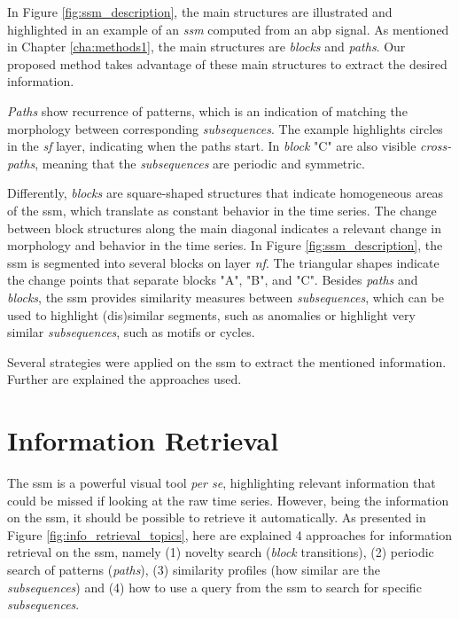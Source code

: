In Figure \ref{fig:ssm_description}, the main structures are illustrated and highlighted in an example of an \textit{\gls{ssm}} \cite{audiolabs1} computed from an \gls{abp} signal. As mentioned in Chapter \ref{cha:methods1}, the main structures are \textit{blocks} and \textit{paths}. Our proposed method takes advantage of these main structures to extract the desired information.
\par
\textit{Paths} show recurrence of patterns, which is an indication of matching the morphology between corresponding \textit{subsequences}. The example highlights circles in the \textit{sf} layer, indicating when the paths start. In \textit{block} "C" are also visible \textit{cross-paths}, meaning that the \textit{subsequences} are periodic and symmetric.
\par
Differently, \textit{blocks} are square-shaped structures that indicate homogeneous areas of the \gls{ssm}, which translate as constant behavior in the time series. The change between block structures along the main diagonal indicates a relevant change in morphology and behavior in the time series. In Figure \ref{fig:ssm_description}, the \gls{ssm} is segmented into several blocks on layer \textit{nf}. The triangular shapes indicate the change points that separate blocks "A", "B", and "C". Besides \textit{paths} and \textit{blocks}, the \gls{ssm} provides similarity measures between \textit{subsequences}, which can be used to highlight (dis)similar segments, such as anomalies or highlight very similar \textit{subsequences}, such as motifs or cycles.
\par
Several strategies were applied on the \gls{ssm} to extract the mentioned information. Further are explained the approaches used.

\section{Information Retrieval}

The \gls{ssm} is a powerful visual tool \textit{per se}, highlighting relevant information that could be missed if looking at the raw time series. However, being the information on the \gls{ssm}, it should be possible to retrieve it automatically. As presented in Figure \ref{fig:info_retrieval_topics}, here are explained 4 approaches for information retrieval on the \gls{ssm}, namely (1) novelty search (\textit{block} transitions), (2) periodic search of patterns (\textit{paths}), (3) similarity profiles (how similar are the \textit{subsequences}) and (4) how to use a query from the \gls{ssm} to search for specific \textit{subsequences}. 

